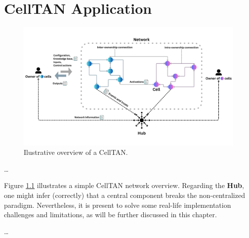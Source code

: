 \chapter{CellTAN Application} \label{chap:chap5}


\begin{figure}[h!]
    \centering
    \includegraphics[width=\linewidth]{figures/chapter4/cell/celltan.pdf}
    \caption{Ilustrative overview of a CellTAN.}
    \label{fig:celltan}
\end{figure}


\dots

Figure \ref{fig:celltan} illustrates a simple CellTAN network overview. Regarding the \textbf{Hub}, one might infer (correctly) that a central component breaks the non-centralized paradigm. Nevertheless, it is present to solve some real-life implementation challenges and limitations, as will be further discussed in this chapter.

\dots